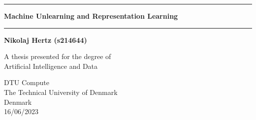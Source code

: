 








\begin{titlepage}
 \BgThispage
   \begin{center}
       \vspace*{1cm}


        \noindent\rule{14cm}{0.6pt}
        
        \vspace{10pt}

        {\Large 
       \textbf{Machine Unlearning and Representation Learning}
        }
    
        \vspace{10pt}

        \noindent\rule{14cm}{0.6pt}

       \vspace{1.5cm}

       \textbf{Nikolaj Hertz (s214644)}

       \vfill
            
       A thesis presented for the degree of\\
       Artificial Intelligence and Data
            
       \vspace{0.8cm}
     
            
       DTU Compute\\
       The Technical University of Denmark\\
       Denmark\\
       16/06/2023
            
   \end{center}
\end{titlepage}